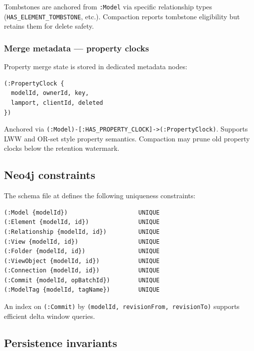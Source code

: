 Tombstones are anchored from \texttt{:Model} via specific relationship types
(\texttt{HAS\_ELEMENT\_TOMBSTONE}, etc.). Compaction reports tombstone
eligibility but retains them for delete safety.

\subsubsection{Merge metadata --- property clocks}

Property merge state is stored in dedicated metadata nodes:

\begin{lstlisting}[caption={PropertyClock node}]
(:PropertyClock {
  modelId, ownerId, key,
  lamport, clientId, deleted
})
\end{lstlisting}

Anchored via \texttt{(:Model)-[:HAS\_PROPERTY\_CLOCK]->(:PropertyClock)}.
Supports LWW and OR-set style property semantics. Compaction may prune old
property clocks below the retention watermark.

\subsection{Neo4j constraints}

The schema file at  defines the following
uniqueness constraints:

\begin{lstlisting}[caption={Uniqueness constraints}]
(:Model {modelId})                    UNIQUE
(:Element {modelId, id})              UNIQUE
(:Relationship {modelId, id})         UNIQUE
(:View {modelId, id})                 UNIQUE
(:Folder {modelId, id})               UNIQUE
(:ViewObject {modelId, id})           UNIQUE
(:Connection {modelId, id})           UNIQUE
(:Commit {modelId, opBatchId})        UNIQUE
(:ModelTag {modelId, tagName})        UNIQUE
\end{lstlisting}

An index on \texttt{(:Commit)} by \texttt{(modelId, revisionFrom, revisionTo)}
supports efficient delta window queries.

\subsection{Persistence invariants}

